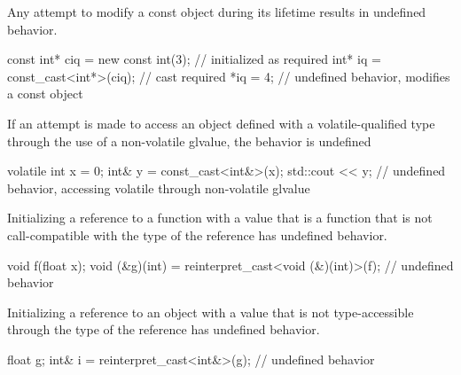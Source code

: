 \pnum
Any attempt to modify a const object during its lifetime results in
undefined behavior.

\pnum
\begin{example}
\begin{codeblock}
const int* ciq = new const int(3);  // initialized as required
int* iq = const_cast<int*>(ciq);    // cast required
*iq = 4;                            // undefined behavior, modifies a const object
\end{codeblock}
\end{example}


\pnum
If an attempt is made to access an object
defined with a volatile-qualified type
through the use of a non-volatile glvalue,
the behavior is undefined

\pnum
\begin{example}
\begin{codeblock}
volatile int x = 0;
int& y = const_cast<int&>(x);
std::cout << y;         // undefined behavior, accessing volatile through non-volatile glvalue
\end{codeblock}
\end{example}


\pnum
Initializing a reference to a function
with a value that is a function
that is not call-compatible
with the type of the reference
has undefined behavior.

\pnum
\begin{example}
\begin{codeblock}
void f(float x);
void (&g)(int) = reinterpret_cast<void (&)(int)>(f);    // undefined behavior
\end{codeblock}
\end{example}


\pnum
Initializing a reference to an object
with a value that is not
type-accessible through
the type of the reference
has undefined behavior.

\pnum
\begin{example}
\begin{codeblock}
float g;
int& i = reinterpret_cast<int&>(g);     // undefined behavior
\end{codeblock}
\end{example}


